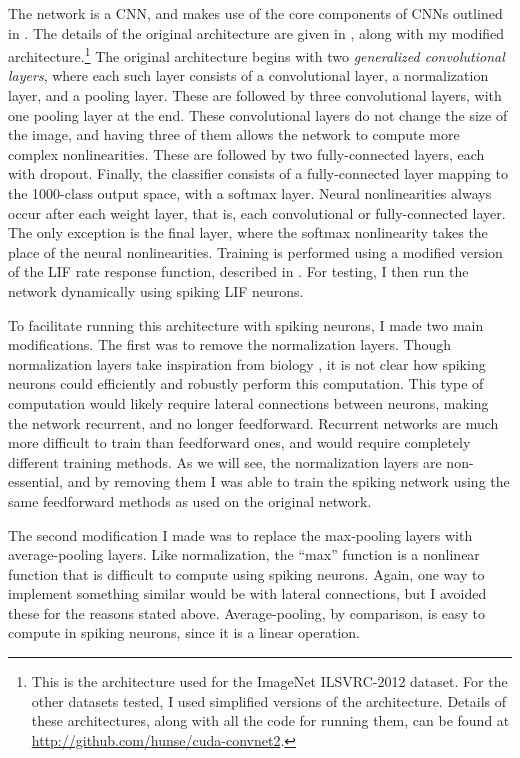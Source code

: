 The network is a CNN,
and makes use of the core components of CNNs outlined in .
The details of the original architecture are given in ,
along with my modified architecture.\footnote{
  This is the architecture used for the ImageNet ILSVRC-2012 dataset.
  For the other datasets tested,
  I used simplified versions of the architecture.
  Details of these architectures,
  along with all the code for running them,
  can be found at \url{http://github.com/hunse/cuda-convnet2}.}
The original architecture begins with two \emph{generalized convolutional layers},
where each such layer consists of a convolutional layer,
a normalization layer, and a pooling layer.
These are followed by three convolutional layers,
with one pooling layer at the end.
These convolutional layers do not change the size of the image,
and having three of them allows the network to compute more complex nonlinearities.
These are followed by two fully-connected layers, each with dropout.
Finally, the classifier consists of a fully-connected layer
mapping to the 1000-class output space, with a softmax layer.
Neural nonlinearities always occur after each weight layer,
that is, each convolutional or fully-connected layer.
The only exception is the final layer,
where the softmax nonlinearity takes the place of the neural nonlinearities.
Training is performed using a modified version of the LIF rate response function,
described in .
For testing, I then run the network dynamically using spiking LIF neurons.

To facilitate running this architecture with spiking neurons,
I made two main modifications.
The first was to remove the normalization layers.
Though normalization layers take inspiration from biology \textcite{Jarrett2009},
it is not clear how spiking neurons could efficiently and robustly
perform this computation.
This type of computation would likely require lateral connections between neurons,
making the network recurrent, and no longer feedforward.
Recurrent networks are much more difficult to train than feedforward ones,
and would require completely different training methods.
As we will see, the normalization layers are non-essential,
and by removing them I was able to train the spiking network using the same
feedforward methods as used on the original network.

The second modification I made was to replace
the max-pooling layers with average-pooling layers.
Like normalization, the ``max'' function is a nonlinear function
that is difficult to compute using spiking neurons.
Again, one way to implement something similar would be with lateral connections,
but I avoided these for the reasons stated above.
Average-pooling, by comparison,
is easy to compute in spiking neurons, since it is a linear operation.

